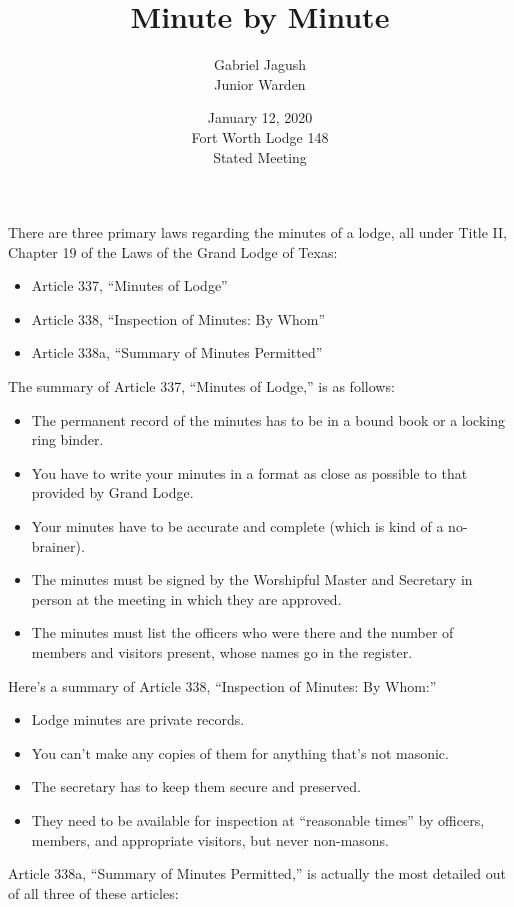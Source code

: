 \documentclass{article}
\title{Minute by Minute}
\author{Gabriel Jagush\\Junior Warden}
\date{January 12, 2020\\Fort Worth Lodge \textnumero{} 148\\Stated Meeting}
\begin{document}
	\maketitle
	
	There are three primary laws regarding the minutes of a lodge, all under Title II, Chapter 19 of the Laws of the Grand Lodge of Texas:
	
	\begin{itemize}
		\item Article 337, ``Minutes of Lodge''
		\item Article 338, ``Inspection of Minutes: By Whom''
		\item Article 338a, ``Summary of Minutes Permitted'' 
	\end{itemize}
	
	The summary of Article 337, ``Minutes of Lodge,'' is as follows:
	
	\begin{itemize}
		\item The permanent record of the minutes has to be in a bound book or a locking ring binder.
		\item You have to write your minutes in a format as close as possible to that provided by Grand Lodge.
		\item Your minutes have to be accurate and complete (which is kind of a no-brainer).
		\item The minutes must be signed by the Worshipful Master and Secretary in person at the meeting in which they are approved.
		\item The minutes must list the officers who were there and the number of members and visitors present, whose names go in the register.
	\end{itemize}

	Here's a summary of Article 338, ``Inspection of Minutes: By Whom:''
	
	\begin{itemize}
		\item Lodge minutes are private records.
		\item You can't make any copies of them for anything that's not masonic.
		\item The secretary has to keep them secure and preserved.
		\item They need to be available for inspection at ``reasonable times'' by officers, members, and appropriate visitors, but never non-masons.
	\end{itemize}

	Article 338a, ``Summary of Minutes Permitted,'' is actually the most detailed out of all three of these articles:
	
\end{document}
